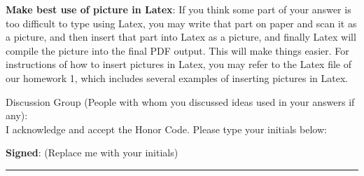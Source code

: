 \documentclass[12pt]{article}
\begin{document}
\vspace{.5cm}

\textbf{Make best use of picture in Latex}: If you think some part of your answer is too difficult to type using Latex, you may write that part on paper and scan it as a picture, and then insert that part into Latex as a picture, and finally Latex will compile the picture into the final PDF output. This will make things easier. For instructions of how to insert pictures in Latex, you may refer to the Latex file of our homework 1, which includes several examples of inserting pictures in Latex.


\hrulefill

Discussion Group (People with whom you discussed ideas used in your answers if any):     \\[1ex]


I acknowledge and accept the Honor Code. Please type your initials below:

\textbf{Signed}: ({\color{blue}Replace me with your initials})



\rule{\linewidth}{0.4pt}
\end{document}
